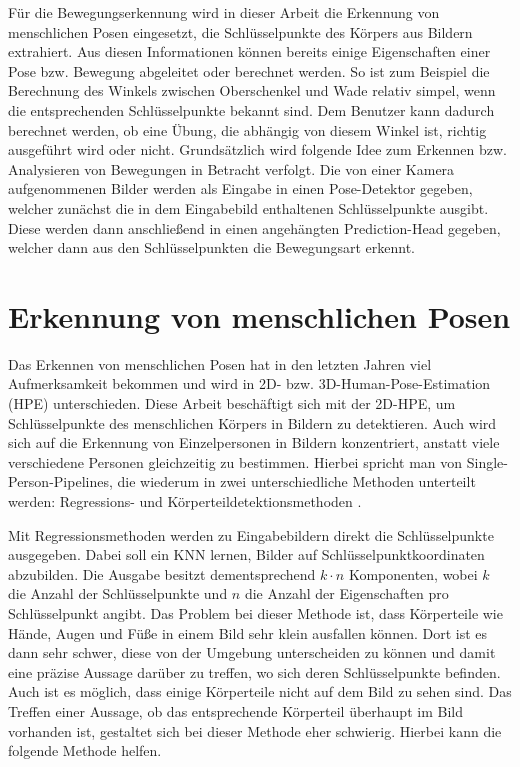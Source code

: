 Für die Bewegungserkennung wird in dieser Arbeit die Erkennung von menschlichen
Posen eingesetzt, die Schlüsselpunkte des Körpers aus Bildern extrahiert. Aus
diesen Informationen können bereits einige Eigenschaften einer Pose bzw.
Bewegung abgeleitet oder berechnet werden. So ist zum Beispiel die Berechnung
des Winkels zwischen Oberschenkel und Wade relativ simpel, wenn die
entsprechenden Schlüsselpunkte bekannt sind. Dem Benutzer kann dadurch
berechnet werden, ob eine Übung, die abhängig von diesem Winkel ist, richtig
ausgeführt wird oder nicht. Grundsätzlich wird folgende Idee zum Erkennen bzw.
Analysieren von Bewegungen in Betracht verfolgt.  Die von einer Kamera
aufgenommenen Bilder werden als Eingabe in einen Pose-Detektor gegeben, welcher
zunächst die in dem Eingabebild enthaltenen Schlüsselpunkte ausgibt.  Diese
werden dann anschließend in einen angehängten Prediction-Head gegeben, welcher
dann aus den Schlüsselpunkten die Bewegungsart erkennt.

\section{Erkennung von menschlichen Posen}
Das Erkennen von menschlichen Posen hat in den letzten Jahren viel
Aufmerksamkeit bekommen und wird in 2D- bzw. 3D-Human-Pose-Estimation (HPE)
unterschieden. Diese Arbeit beschäftigt sich mit der 2D-HPE, um Schlüsselpunkte
des menschlichen Körpers in Bildern zu detektieren. Auch wird sich auf die
Erkennung von Einzelpersonen in Bildern konzentriert, anstatt viele
verschiedene Personen gleichzeitig zu bestimmen. Hierbei spricht man von
Single-Person-Pipelines, die wiederum in zwei unterschiedliche Methoden
unterteilt werden: Regressions- und Körperteildetektionsmethoden
\cite{zheng2021deep}.

Mit Regressionsmethoden werden zu Eingabebildern direkt die Schlüsselpunkte
ausgegeben. Dabei soll ein KNN lernen, Bilder auf Schlüsselpunktkoordinaten
abzubilden. Die Ausgabe besitzt dementsprechend $k \cdot n$ Komponenten, wobei
$k$ die Anzahl der Schlüsselpunkte und $n$ die Anzahl der Eigenschaften pro
Schlüsselpunkt angibt. Das Problem bei dieser Methode ist, dass Körperteile wie
Hände, Augen und Füße in einem Bild sehr klein ausfallen können. Dort ist es
dann sehr schwer, diese von der Umgebung unterscheiden zu können und damit eine
präzise Aussage darüber zu treffen, wo sich deren Schlüsselpunkte befinden.
Auch ist es möglich, dass einige Körperteile nicht auf dem Bild zu sehen sind.
Das Treffen einer Aussage, ob das entsprechende Körperteil überhaupt im Bild
vorhanden ist, gestaltet sich bei dieser Methode eher schwierig. Hierbei kann
die folgende Methode helfen.

